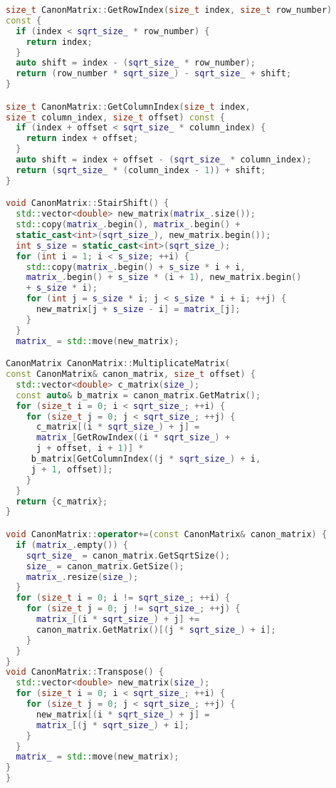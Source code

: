 \documentclass[20pt]{article}
\begin{document}
\begin{lstlisting}[language=C++]
size_t CanonMatrix::GetRowIndex(size_t index, size_t row_number) 
const {
  if (index < sqrt_size_ * row_number) {
    return index;
  }
  auto shift = index - (sqrt_size_ * row_number);
  return (row_number * sqrt_size_) - sqrt_size_ + shift;
}

size_t CanonMatrix::GetColumnIndex(size_t index, 
size_t column_index, size_t offset) const {
  if (index + offset < sqrt_size_ * column_index) {
    return index + offset;
  }
  auto shift = index + offset - (sqrt_size_ * column_index);
  return (sqrt_size_ * (column_index - 1)) + shift;
}

void CanonMatrix::StairShift() {
  std::vector<double> new_matrix(matrix_.size());
  std::copy(matrix_.begin(), matrix_.begin() + 
  static_cast<int>(sqrt_size_), new_matrix.begin());
  int s_size = static_cast<int>(sqrt_size_);
  for (int i = 1; i < s_size; ++i) {
    std::copy(matrix_.begin() + s_size * i + i, 
    matrix_.begin() + s_size * (i + 1), new_matrix.begin() 
    + s_size * i);
    for (int j = s_size * i; j < s_size * i + i; ++j) {
      new_matrix[j + s_size - i] = matrix_[j];
    }
  }
  matrix_ = std::move(new_matrix);

CanonMatrix CanonMatrix::MultiplicateMatrix(
const CanonMatrix& canon_matrix, size_t offset) {
  std::vector<double> c_matrix(size_);
  const auto& b_matrix = canon_matrix.GetMatrix();
  for (size_t i = 0; i < sqrt_size_; ++i) {
    for (size_t j = 0; j < sqrt_size_; ++j) {
      c_matrix[(i * sqrt_size_) + j] = 
      matrix_[GetRowIndex((i * sqrt_size_) +
      j + offset, i + 1)] *
     b_matrix[GetColumnIndex((j * sqrt_size_) + i, 
     j + 1, offset)];
    }
  }
  return {c_matrix};
}

void CanonMatrix::operator+=(const CanonMatrix& canon_matrix) {
  if (matrix_.empty()) {
    sqrt_size_ = canon_matrix.GetSqrtSize();
    size_ = canon_matrix.GetSize();
    matrix_.resize(size_);
  }
  for (size_t i = 0; i != sqrt_size_; ++i) {
    for (size_t j = 0; j != sqrt_size_; ++j) {
      matrix_[(i * sqrt_size_) + j] += 
      canon_matrix.GetMatrix()[(j * sqrt_size_) + i];
    }
  }
}
void CanonMatrix::Transpose() {
  std::vector<double> new_matrix(size_);
  for (size_t i = 0; i < sqrt_size_; ++i) {
    for (size_t j = 0; j < sqrt_size_; ++j) {
      new_matrix[(i * sqrt_size_) + j] = 
      matrix_[(j * sqrt_size_) + i];
    }
  }
  matrix_ = std::move(new_matrix);
}
}
\end{lstlisting} 
\end{document}
